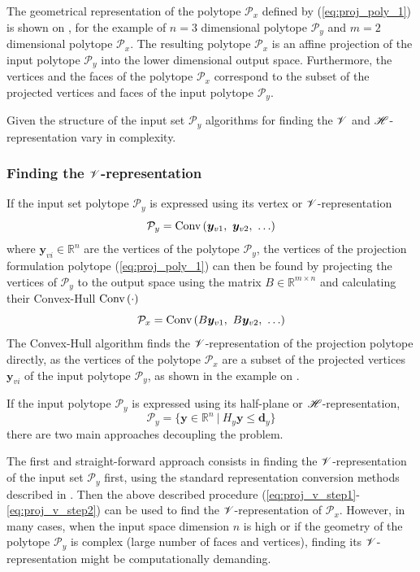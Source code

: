 The geometrical representation of the polytope $\mathcal{P}_x$ defined by (\ref{eq:proj_poly_1}) is shown on , for the example of $n=3$ dimensional polytope $\mathcal{P}_y$ and $m=2$ dimensional polytope $\mathcal{P}_x$. The resulting polytope $\mathcal{P}_x$ is an affine projection of the input polytope $\mathcal{P}_y$ into the lower dimensional output space. Furthermore, the vertices and the faces of the polytope $\mathcal{P}_x$ correspond to the subset of the projected vertices and faces of the input polytope $\mathcal{P}_y$. 

Given the structure of the input set $\mathcal{P}_y$ algorithms for finding the $\mathscr{V}$ and $\mathscr{H}$-representation vary in complexity. 

\subsubsection{Finding the $\mathscr{V}$-representation}
\label{ch:proj_algos_v}
If the input set polytope $\mathcal{P}_y$ is expressed using its vertex or $\mathscr{V}$-representation
\begin{equation}
    \mathcal{P}_y = \text{Conv}\left( \bm{y}_{v1}, ~ \bm{y}_{v2},~ \ldots\right)
    \label{eq:proj_v_step1}
\end{equation}
where $\bm{y}_{vi}\in\mathbb{R}^n$ are the vertices of the polytope $\mathcal{P}_y$, the vertices of the projection formulation polytope (\ref{eq:proj_poly_1}) can then be found by projecting the vertices of $\mathcal{P}_y$ to the output space using the matrix $B \in \mathbb{R}^{m\times n}$ and calculating their Convex-Hull $\text{Conv}\left(\cdot\right)$
\begin{equation}
    \mathcal{P}_x= \text{Conv}\left( B\bm{y}_{v1}, ~ B\bm{y}_{v2},~ \ldots\right)
    \label{eq:proj_v_step2}
\end{equation}
The Convex-Hull algorithm finds the $\mathscr{V}$-representation of the projection polytope directly, as the vertices of the polytope $\mathcal{P}_x$ are a subset of the projected vertices $\bm{y}_{vi}$ of the input polytope $\mathcal{P}_y$, as shown in the example on . 

If the input polytope $\mathcal{P}_y$ is expressed using its half-plane or $\mathscr{H}$-representation, 
\begin{equation}
    \mathcal{P}_y = \{ \bm{y}\in\mathbb{R}^n ~|~H_y\bm{y} \leq \bm{d}_y\}
\end{equation}
there are two main approaches decoupling the problem.

The first and straight-forward approach consists in finding the $\mathscr{V}$-representation of the input set $\mathcal{P}_y$ first, using the standard representation conversion methods described in . Then the above described procedure (\ref{eq:proj_v_step1}-\ref{eq:proj_v_step2}) can be used to find the $\mathscr{V}$-representation of  $\mathcal{P}_x$. However, in many cases, when the input space dimension $n$ is high or if the geometry of the polytope  $\mathcal{P}_y$ is complex (large number of faces and vertices), finding its $\mathscr{V}$-representation might be computationally demanding. 

